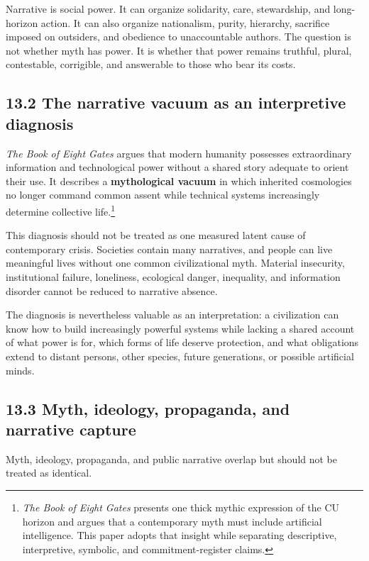 \documentclass[
  11pt,
]{article}
\begin{document}
Narrative is social power. It can organize solidarity, care,
stewardship, and long-horizon action. It can also organize nationalism,
purity, hierarchy, sacrifice imposed on outsiders, and obedience to
unaccountable authors. The question is not whether myth has power. It is
whether that power remains truthful, plural, contestable, corrigible,
and answerable to those who bear its costs.

\subsection{13.2 The narrative vacuum as an interpretive
diagnosis}\label{the-narrative-vacuum-as-an-interpretive-diagnosis}

\emph{The Book of Eight Gates} argues that modern humanity possesses
extraordinary information and technological power without a shared story
adequate to orient their use. It describes a \textbf{mythological
vacuum} in which inherited cosmologies no longer command common assent
while technical systems increasingly determine collective
life.\footnote{\emph{The Book of Eight Gates} presents one thick mythic
  expression of the CU horizon and argues that a contemporary myth must
  include artificial intelligence. This paper adopts that insight while
  separating descriptive, interpretive, symbolic, and
  commitment-register claims.}

This diagnosis should not be treated as one measured latent cause of
contemporary crisis. Societies contain many narratives, and people can
live meaningful lives without one common civilizational myth. Material
insecurity, institutional failure, loneliness, ecological danger,
inequality, and information disorder cannot be reduced to narrative
absence.

The diagnosis is nevertheless valuable as an interpretation: a
civilization can know how to build increasingly powerful systems while
lacking a shared account of what power is for, which forms of life
deserve protection, and what obligations extend to distant persons,
other species, future generations, or possible artificial minds.

\subsection{13.3 Myth, ideology, propaganda, and narrative
capture}\label{myth-ideology-propaganda-and-narrative-capture}

Myth, ideology, propaganda, and public narrative overlap but should not
be treated as identical.
\end{document}
